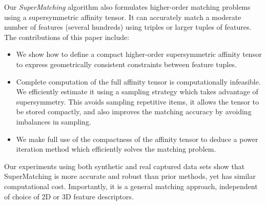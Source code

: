 Our \emph{SuperMatching} algorithm also formulates higher-order matching problems using a supersymmetric affinity tensor. It can accurately match a moderate number
of features (several hundreds) using triples or larger tuples of features.
The contributions of this paper include:
\begin{itemize}
\item We show how to define a compact higher-order supersymmetric affinity tensor to express geometrically consistent constraints between feature tuples.

\item Complete computation of the full affinity tensor is computationally infeasible. We efficiently estimate it using a sampling strategy which takes advantage of supersymmetry. This avoids sampling repetitive items, it allows the tensor to be stored compactly, and also improves the matching accuracy by avoiding imbalances in sampling.

\item We make full use of the compactness of the affinity tensor to deduce a power iteration method which efficiently solves the matching problem.
\end{itemize}

Our experiments using both synthetic and real captured data sets show that SuperMatching is more accurate and robust than prior methods,
yet has similar computational cost.
Importantly, it is a general matching approach, independent of choice of 2D or 3D feature descriptors.
